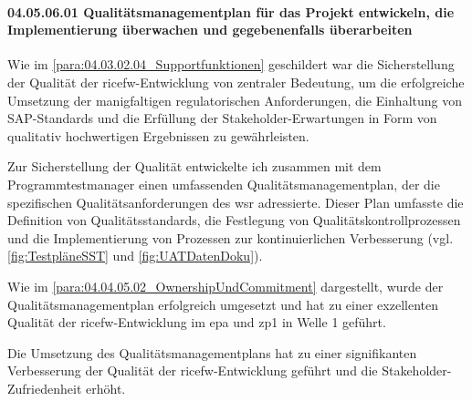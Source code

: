 \paragraph*{04.05.06.01 Qualitätsmanagementplan für das Projekt entwickeln, die Implementierung
überwachen und gegebenenfalls überarbeiten}
\label{para:04.05.06.01_Qualitätsmanagementplan}

\par Wie im \ref{para:04.03.02.04_Supportfunktionen} geschildert war die Sicherstellung der Qualität der \gls{ricefw}-Entwicklung von zentraler Bedeutung, um die erfolgreiche Umsetzung der manigfaltigen regulatorischen Anforderungen, die Einhaltung von SAP-Standards und die Erfüllung der Stakeholder-Erwartungen in Form von qualitativ hochwertigen Ergebnissen zu gewährleisten. 

\par Zur Sicherstellung der Qualität entwickelte ich zusammen mit dem Programmtestmanager einen umfassenden Qualitätsmanagementplan, der die spezifischen Qualitätsanforderungen des \gls{wsr} adressierte. Dieser Plan umfasste die Definition von Qualitätsstandards, die Festlegung von Qualitätskontrollprozessen und die Implementierung von Prozessen zur kontinuierlichen Verbesserung (vgl. \autoref{fig:TestpläneSST} und \autoref{fig:UATDatenDoku}).

\par Wie im \ref{para:04.04.05.02_OwnershipUndCommitment} dargestellt, wurde der Qualitätsmanagementplan erfolgreich umgesetzt und hat zu einer exzellenten Qualität der \gls{ricefw}-Entwicklung im \gls{epa} und \gls{zp1} in Welle 1 geführt.

\par Die Umsetzung des Qualitätsmanagementplans hat zu einer signifikanten Verbesserung der Qualität der \gls{ricefw}-Entwicklung geführt und die Stakeholder-Zufriedenheit erhöht.